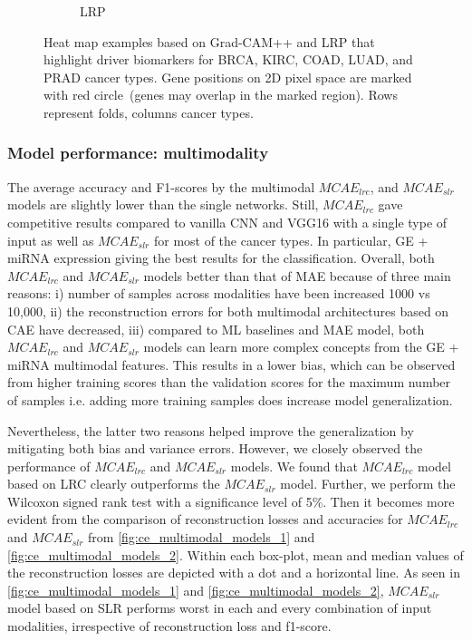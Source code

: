 \begin{figure}
\begin{subfigure}{0.48\linewidth}
		\caption{LRP}
        \label{fig:lrp}
	\end{subfigure}
	\caption[Heatmap example to mark driver biomarker for different cancer types]{Heat map examples based on Grad-CAM++ and LRP that highlight driver biomarkers for BRCA, KIRC, COAD, LUAD, and PRAD cancer types. Gene positions on 2D pixel space are marked with red circle~(genes may overlap in the marked region). Rows represent folds,  columns cancer types.} 
	\label{fig:hm_all}
	\vspace{-2mm}
\end{figure}

\subsubsection{Model performance: multimodality}
The average accuracy and F1-scores by the multimodal $MCAE_{lrc}$, and $MCAE_{slr}$ models are slightly lower than the single networks. Still, $MCAE_{lrc}$ gave competitive results compared to vanilla CNN and VGG16 with a single type of input as well as $MCAE_{slr}$ for most of the cancer types. 
In particular, GE + miRNA expression giving the best results for the classification.
Overall, both $MCAE_{lrc}$ and $MCAE_{slr}$ models better than that of MAE because of three main reasons: i) number of samples across modalities have been increased 1000 vs 10,000, ii) the reconstruction errors for both multimodal architectures based on CAE have decreased, iii) compared to ML baselines and MAE model, both $MCAE_{lrc}$ and $MCAE_{slr}$ models can learn more complex concepts from the GE + miRNA multimodal features. This results in a lower bias, which can be observed from higher training scores than the validation scores for the maximum number of samples i.e. adding more training samples does increase model generalization. 

\hspace*{3.5mm} Nevertheless, the latter two reasons helped improve the generalization by mitigating both bias and variance errors. However, we closely observed the performance of $MCAE_{lrc}$ and $MCAE_{slr}$ models. We found that $MCAE_{lrc}$ model based on LRC clearly outperforms the $MCAE_{slr}$ model. Further, we perform the Wilcoxon signed rank test with a significance level of 5\%. Then it becomes more evident from the comparison of reconstruction losses and accuracies for $MCAE_{lrc}$ and $MCAE_{slr}$ from \cref{fig:ce_multimodal_models_1} and \cref{fig:ce_multimodal_models_2}. Within each box-plot, mean and median values of the reconstruction losses are depicted with a dot and a horizontal line. As seen in \cref{fig:ce_multimodal_models_1} and \cref{fig:ce_multimodal_models_2}, $MCAE_{slr}$ model based on SLR performs worst in each and every combination of input modalities, irrespective of reconstruction loss and f1-score. 

